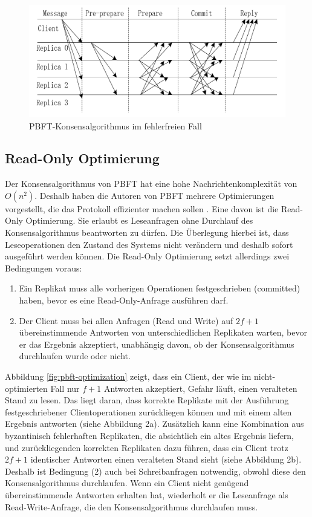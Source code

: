 \documentclass[nonacm,sigconf,natbib=false]{acmart}
\begin{document}
\begin{figure}[htbp]
  \centering
  \includegraphics[width=\linewidth]{pbft-normal.png}
  \caption{PBFT-Konsensalgorithmus im fehlerfreien Fall}
  \label{fig:pbft-normal}
\end{figure}

\subsection{Read-Only Optimierung}

Der Konsensalgorithmus von PBFT hat eine hohe Nachrichtenkomplexität von $O(n^2)$. Deshalb haben die Autoren von PBFT mehrere Optimierungen vorgestellt, die das Protokoll effizienter machen sollen \cite{pbft-optimization}. Eine davon ist die Read-Only Optimierung. Sie erlaubt es Leseanfragen ohne Durchlauf des Konsensalgorithmus beantworten zu dürfen. Die Überlegung hierbei ist, dass Leseoperationen den Zustand des Systems nicht verändern und deshalb sofort ausgeführt werden können. Die Read-Only Optimierung setzt allerdings zwei Bedingungen voraus:
\begin{enumerate}
  \item Ein Replikat muss alle vorherigen Operationen festgeschrieben (committed) haben, bevor es eine Read-Only-Anfrage ausführen darf.
  \item Der Client muss bei allen Anfragen (Read und Write) auf $2f+1$ übereinstimmende Antworten von unterschiedlichen Replikaten warten, bevor er das Ergebnis akzeptiert, unabhängig davon, ob der Konsensalgorithmus durchlaufen wurde oder nicht. 
\end{enumerate}
Abbildung \ref{fig:pbft-optimization} zeigt, dass ein Client, der wie im nicht-optimierten Fall nur $f+1$ Antworten akzeptiert, Gefahr läuft, einen veralteten Stand zu lesen. Das liegt daran, dass korrekte Replikate mit der Ausführung festgeschriebener Clientoperationen zurückliegen können und mit einem alten Ergebnis antworten (siehe Abbildung 2a). Zusätzlich kann eine Kombination aus byzantinisch fehlerhaften Replikaten, die absichtlich ein altes Ergebnis liefern, und zurückliegenden korrekten Replikaten dazu führen, dass ein Client trotz $2f+1$ identischer Antworten einen veralteten Stand sieht (siehe Abbildung 2b). Deshalb ist Bedingung (2) auch bei Schreibanfragen notwendig, obwohl diese den Konsensalgorithmus durchlaufen. Wenn ein Client nicht genügend übereinstimmende Antworten erhalten hat, wiederholt er die Leseanfrage als Read-Write-Anfrage, die den Konsensalgorithmus durchlaufen muss.
\end{document}
